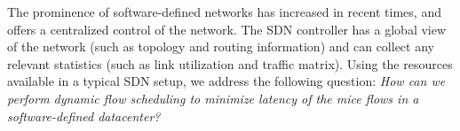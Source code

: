 The prominence of software-defined networks has increased in recent times, and offers a centralized control of the network. The SDN controller has a global view of the network (such as topology and routing information) and can collect any relevant statistics (such as link utilization and traffic matrix). Using the resources available in a typical SDN setup, 
we address the following question: \emph{How can we perform dynamic flow scheduling to minimize latency of the mice flows in a software-defined datacenter? }  
